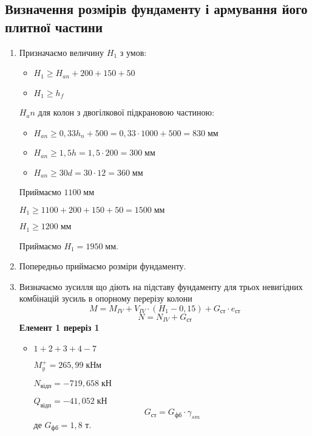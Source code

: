 \documentclass[a4paper,14pt]{article}
\begin{document}
\subsection{Визначення розмірів фундаменту і армування його плитної частини}
\begin{enumerate}
    \item Призначаємо величину $H_1$ з умов: 
    \begin{itemize}
        \item $H_1 \geqslant H_{an} + 200 + 150 + 50$
        \item $H_1 \geqslant h_f$
    \end{itemize}
    $H_an$  для колон з двогілкової підкрановою частиною:
    \begin{itemize}
        \item $H_{an} \geqslant 0,33h_n + 500 = 0,33 \cdot 1000 + 500 = 830\;\textit{мм}$
        \item $H_{an} \geqslant 1,5h = 1,5 \cdot 200 = 300\;\textit{мм}$
        \item $H_{an} \geqslant 30d = 30 \cdot 12 = 360\;\textit{мм}$
    \end{itemize}
    Приймаємо $1100\;\textit{мм}$

     $H_1 \geqslant 1100 + 200 + 150 + 50 = 1500\;\textit{мм}$

     $H_1 \geqslant 1200\;\textit{мм}$

     Приймаємо $H_1 = 1950\;\text{мм}$.
    \item Попередньо приймаємо розміри фундаменту. %
    \item Визначаємо зусилля що діють на підставу фундаменту для трьох невигідних комбінацій зусиль в опорному перерізу колони
    \begin{equation}
        M = M_{IV} + V_{IV} \cdot (H_1 - 0,15) + G_{\textit{ст}} \cdot e_{\textit{ст}}
    \end{equation}
    \begin{equation}
        N = N_{IV} + G_{\textit{ст}}
    \end{equation}
    \textbf{Елемент 1 переріз 1}
    \begin{itemize}
        \item $1 + 2 + 3 + 4 - 7$
     
        $M_y^+ = 265,99\;\textit{кНм}$
        
        $N_{\textit{відп}} = - 719,658\;\textit{кН}$
   
        $Q_{\textit{відп}} = - 41,052\;\textit{кН}$
       \begin{equation}
           G_{\textit{ст}} = G_{\textit{фб}} \cdot \gamma_{sm}
       \end{equation}
       де $G_{\textit{фб}} = 1,8$ т.
   

\end{itemize}
\end{enumerate}
\end{document}
